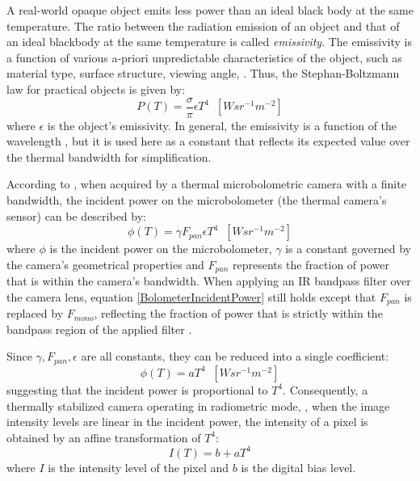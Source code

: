 A real-world opaque object emits less power than an ideal black body at the same temperature. 
The ratio between the radiation emission of an object and that of an ideal blackbody at the same temperature is called \emph{emissivity}.
The emissivity is a function of various a-priori unpredictable characteristics of the object, such as material type, surface structure, viewing angle, \etc.
Thus, the Stephan-Boltzmann law for practical objects is given by:
\begin{equation} \label{stephan-boltzmann-practical}
  P(T) =  \frac{\sigma}{\pi} \epsilon T^4 \; \; \left[W sr^{-1} m^{-2}\right]
\end{equation} 
where $\epsilon$ is the object's emissivity.
In general, the emissivity is a function of the wavelength \cite{kerekes2008spectral}, but it is used here as a constant that reflects its expected value over the thermal bandwidth for simplification.

According to \cite{FundamentalsOfInfraredThermalImaging}, when acquired by a thermal microbolometric camera with a finite bandwidth, the incident power on the microbolometer (the thermal camera's sensor) can be described by:
\begin{equation} \label{BolometerIncidentPower}
  \phi(T) = \gamma F_\mathit{pan} \epsilon T^4 \; \; \left[W sr^{-1} m^{-2}\right]
\end{equation}
where $\phi$ is the incident power on the microbolometer, $\gamma$ is a constant governed by the camera's geometrical properties and $F_\mathit{pan}$ represents the fraction of power that is within the camera's bandwidth.
When applying an IR bandpass filter over the camera lens, equation \ref{BolometerIncidentPower} still holds except that $F_\mathit{pan}$ is replaced by $F_\mathit{mono}$, reflecting the fraction of power that is strictly within the bandpass region of the applied filter \cite{FundamentalsOfInfraredThermalImaging}.

Since $\gamma, F_\mathit{pan}, \epsilon$ are all constants, they can be reduced into a single coefficient:
\begin{equation} \label{BolometerIncidentPowerSimplified}
  \phi(T) = a T^4 \; \; \left[W sr^{-1} m^{-2}\right]
\end{equation}
suggesting that the incident power is proportional to $T^4$.
Consequently, a thermally stabilized camera operating in radiometric mode, \ie, when the image intensity levels are linear in the incident power, the intensity of a pixel is obtained by an affine transformation of $T^4$:
\begin{equation} \label{eq:naiveAffineTrans}
  I(T) = b + a T^4
\end{equation}
where $I$ is the intensity level of the pixel and $b$ is the digital bias level. 

